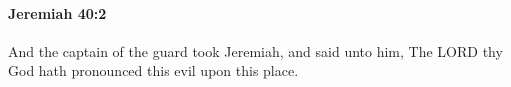 
		\paragraph{Jeremiah 40:2} %
			\label{JEREMIAH-40-2}

			And the captain of the guard took Jeremiah, and said unto him, The LORD thy God hath pronounced this evil upon this place.


